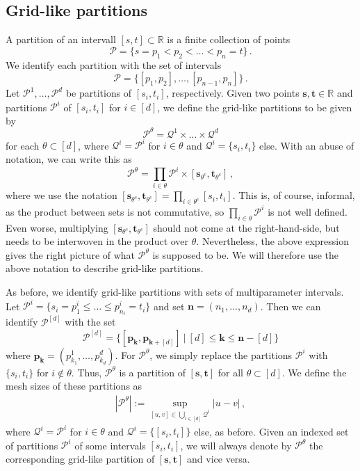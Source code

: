\documentclass[11pt,oneside,english,reqno]{amsart}
\numberwithin{equation}{section}
\numberwithin{figure}{section}
\theoremstyle{plain}
\theoremstyle{definition}
\theoremstyle{remark}
\theoremstyle{plain}
\theoremstyle{plain}
\theoremstyle{plain}
\theoremstyle{plain}
\theoremstyle{plain}
\newcommand{\cP}{\mathcal{P}}
\newcommand{\cQ}{\mathcal{Q}}
\newcommand{\RR}{\mathbb{R}}
\newcommand{\bk}{\mathbf{k}}
\newcommand{\bn}{\mathbf{n}}
\newcommand{\bp}{\mathbf{p}}
\newcommand{\bs}{\mathbf{s}}
\newcommand{\bt}{\mathbf{t}}
\newcommand{\abs}[1]{\left\lvert #1\right\rvert}
\begin{document}
\subsection{Grid-like partitions}

A partition of an intervall $[s,t]\subset\RR$ is a finite collection of points
%
\begin{equation*}
    \cP = \{s=p_1<p_2<\dots<p_n=t\}\,.
\end{equation*}
%
We identify each partition with the set of intervals
%
\begin{equation*}
    \cP = \{[p_1,p_2],\dots,[p_{n-1},p_n]\}\,.
\end{equation*}
%
Let $\cP^1,\dots, \cP^d$ be partitions of $[s_i,t_i]$, respectively. Given two points $\bs,\bt\in \RR$ and partitions $\cP^i$ of $[s_i,t_i]$ for $i\in[d]$, we define the grid-like partitions to be given by
%
\begin{equation*}
    \cP^\theta = \cQ^1\times\dots\times\cQ^d
\end{equation*}
%
for each $\theta\subset[d]$, where $\cQ^i = \cP^i$ for $i\in\theta$ and $\cQ^i = \{s_i,t_i\}$ else. With an abuse of notation, we can write this as
%
\begin{equation*}
    \cP^\theta = \prod_{i\in\theta}\cP^i\times[\bs_{\theta^c},\bt_{\theta^c}]\,,
\end{equation*}
%
where we use the notation $[\bs_{\theta^c},\bt_{\theta^c}] = \prod_{i\in\theta^c} [s_i,t_i]$. This is, of course, informal, as the product between sets is not commutative, so $\prod_{i\in\theta} \cP^i$ is not well defined. Even worse, multiplying $[\bs_{\theta^c},\bt_{\theta^c}]$ should not come at the right-hand-side, but needs to be interwoven in the product over $\theta$. Nevertheless, the above expression gives the right picture of what $\cP^\theta$ is supposed to be. We will therefore use the above notation to describe grid-like partitions.

As before, we identify grid-like partitions with sets of multiparameter intervals. Let $\cP^i = \{s_i = p^i_1\le\dots\le p^i_{n_i} = t_i\}$ and set $\bn = (n_1,\dots, n_d)$. Then we can identify $\cP^{[d]}$ with the set
%
\begin{equation*}
    \cP^{[d]} = \{[\bp_\bk,\bp_{\bk+[d]}]~\vert~ [d]\le \bk\le\bn-[d]\}
\end{equation*}
%
where $\bp_\bk = (p^1_{k_1},\dots,p^d_{k_d})$. For $\cP^\theta$, we simply replace the partitions $\cP^i$ with $\{s_i,t_i\}$ for $i\notin\theta$. Thus, $\cP^\theta$ is a partition of $[\bs,\bt]$ for all $\theta\subset[d]$. We define the mesh sizes of these partitions as
%
\begin{align*}
    \abs{\cP^\theta} := \sup_{[u,v]\in\bigcup_{i\in[d]}\cQ^i}\abs{u-v}\,,
\end{align*}
%
where $\cQ^i = \cP^i$ for $i\in\theta$ and $\cQ^i= \{[s_i,t_i]\}$ else, as before. Given an indexed set of partitions $\cP^i$ of some intervals $[s_i,t_i]$, we will always denote by $\cP^\theta$ the corresponding grid-like partition of $[\bs,\bt]$ and vice versa.
\end{document}
